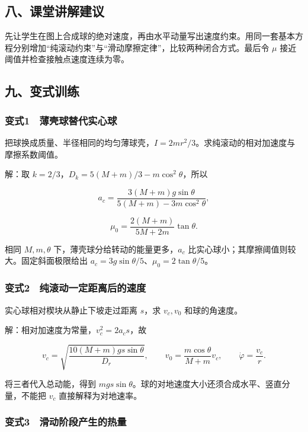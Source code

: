\documentclass[12pt,a4paper,fontset=fandol]{ctexart}
\begin{document}
\subsection{八、课堂讲解建议}\label{ux516bux8bfeux5802ux8bb2ux89e3ux5efaux8bae-2}

先让学生在图上合成球的绝对速度，再由水平动量写出速度约束。用同一套基本方程分别增加``纯滚动约束''与``滑动摩擦定律''，比较两种闭合方式。最后令
\(\mu\) 接近阈值并检查接触点速度连续为零。

\subsection{九、变式训练}\label{ux4e5dux53d8ux5f0fux8badux7ec3-2}

\subsubsection{变式1　薄壳球替代实心球}\label{ux53d8ux5f0f1-ux8584ux58f3ux7403ux66ffux4ee3ux5b9eux5fc3ux7403}

把球换成质量、半径相同的均匀薄球壳，\(I=2mr^2/3\)。求纯滚动的相对加速度与摩擦系数阈值。

解：取 \(k=2/3\)，\(D_k=5(M+m)/3-m\cos^2\theta\)，所以

\[a_c=\frac{3(M+m)g\sin\theta}{5(M+m)-3m\cos^2\theta},\]

\[\mu_0=\frac{2(M+m)}{5M+2m}\tan\theta.\]

相同 \(M,m,\theta\) 下，薄壳球分给转动的能量更多，\(a_c\)
比实心球小；其摩擦阈值则较大。固定斜面极限给出
\(a_c=3g\sin\theta/5\)、\(\mu_0=2\tan\theta/5\)。

\subsubsection{变式2　纯滚动一定距离后的速度}\label{ux53d8ux5f0f2-ux7eafux6edaux52a8ux4e00ux5b9aux8dddux79bbux540eux7684ux901fux5ea6}

实心球相对楔块从静止下坡走过距离 \(s\)，求 \(v_c,v_0\) 和球的角速度。

解：相对加速度为常量，\(v_c^2=2a_cs\)，故

\[v_c=\sqrt{\frac{10(M+m)gs\sin\theta}{D_r}},\qquad
v_0=\frac{m\cos\theta}{M+m}v_c,\qquad
\dot\varphi=\frac{v_c}{r}.\]

将三者代入总动能，得到
\(mgs\sin\theta\)。球的对地速度大小还须合成水平、竖直分量，不能把
\(v_c\) 直接解释为对地速率。

\subsubsection{变式3　滑动阶段产生的热量}\label{ux53d8ux5f0f3-ux6ed1ux52a8ux9636ux6bb5ux4ea7ux751fux7684ux70edux91cf}
\end{document}
